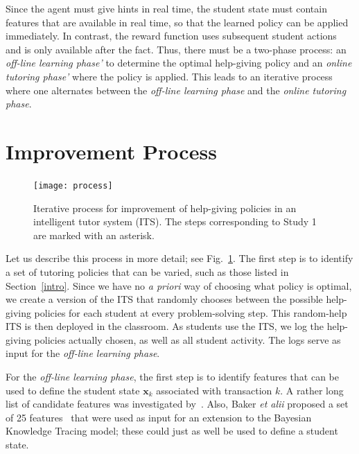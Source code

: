 \documentclass{edm_template}
\begin{document}
Since the agent must give hints in real time, the student state
must contain features that are available in real time, so that
the learned policy can be applied immediately.  In contrast,
the reward function uses subsequent student actions and is only
available after the fact.  Thus, there must be a two-phase process:
an {\em off-line learning phase'} to determine the optimal help-giving 
policy and an {\em online tutoring phase'} where the policy is applied.
This leads to an iterative process where one alternates between 
the {\em off-line learning phase} and the {\em online tutoring phase}.

\section{Improvement Process}
%
%
%
\begin{figure}
\centering    \texttt{[image: process]}
\caption{Iterative process for improvement of help-giving policies in
  an intelligent  tutor system (ITS).  The steps corresponding to Study 1 are marked
  with an asterisk.} \label{process}
\end{figure}

\label{improvement}

Let us describe this process in more detail; see Fig.~\ref{process}.  The first
step is to identify a set of tutoring policies that can be varied,
such as those listed in Section~\ref{intro}.  Since we have no {\em a priori}
way of choosing what policy is optimal, we create a version of the ITS
that randomly chooses between the possible help-giving policies for each student
at every problem-solving step.  This random-help ITS is then deployed
in the classroom.  As students use the ITS, we log the help-giving policies actually chosen, as well
as all student activity.  The logs serve as input for the
{\em off-line learning phase}.

For the {\em off-line learning phase}, the first step is to identify
features that can be used to define the student state $\mathbf{x}_k$
associated with transaction $k$.  A rather
long list of candidate features was investigated
by~\cite{chi_micro-level_2009}.  Also, Baker {\em et alii} proposed
a set of 25 features~\citeyear{baker_more_2008} that were used as input 
for an extension to the Bayesian Knowledge Tracing model;  these
could just as well be used to define a student state.
\end{document}
